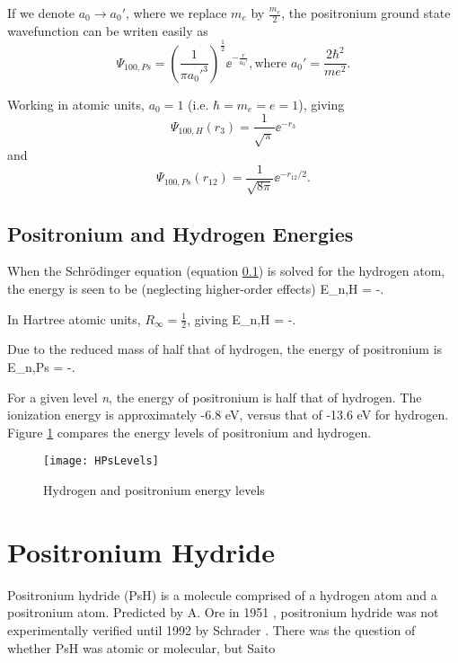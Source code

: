 \documentclass[Introduction.tex]{subfiles}
\begin{document}
If we denote $a_0 \rightarrow a_0'$, where we replace $m_e$ by $\frac{m_e}{2}$, the positronium ground state wavefunction can be writen easily as
\begin{equation}
\Psi_{100,Ps} = \left(\frac{1}{\pi {a_0'}^3}\right)^{\frac{1}{2}} \!\! \ee^{-\frac{r}{a_0'}},
\text{where } a_0' = \frac{2\hbar^2}{m e^2}.
\end{equation}

Working in atomic units, $a_0 = 1$ (i.e. $\hbar = m_e = e = 1$), giving
\begin{equation}
\Psi_{100,H}\left(r_3\right) = \frac{1}{\sqrt{\pi}} \ee^{-r_3}
\label{eq:HWave}
\end{equation}
and
\begin{equation}
\Psi_{100,Ps}\left(r_{12}\right) = \frac{1}{\sqrt{8 \pi}} \ee^{-r_{12}/2}.
\label{eq:PsWave}
\end{equation}

\subsection{Positronium and Hydrogen Energies}

When the Schr\"{o}dinger equation (equation \ref{}) is solved for the hydrogen atom, the energy is seen to be (neglecting higher-order effects)
\beq
\label{eq:HEnergy}
E_{n,H} = -.
\eeq

\noindent In Hartree atomic units, $R_\infty = \frac{1}{2}$, giving
\beq
\label{eq:HEnergyAU}
E_{n,H} = -.
\eeq

\noindent Due to the reduced mass of half that of hydrogen, the energy of positronium is
\beq
\label{eq:PsEnergyAU}
E_{n,Ps} = -.
\eeq

\noindent For a given level \emph{n}, the energy of positronium is half that of hydrogen.  The ionization energy is approximately -6.8 eV, versus that of -13.6 eV for hydrogen.  Figure \ref{fig:HPsLevels} compares the energy levels of positronium and hydrogen.

\begin{figure}[H]
	\centering
	\texttt{[image: HPsLevels]}
	\caption{Hydrogen and positronium energy levels}
	\label{fig:HPsLevels}
\end{figure}

\section{Positronium Hydride}
\label{sec:PsH}
Positronium hydride (PsH) is a molecule comprised of a hydrogen atom and a positronium atom.  Predicted by A. Ore in 1951 \cite{Ore1951}, positronium hydride was not experimentally verified until 1992 by Schrader \cite{Schrader1992}. There was the question of whether PsH was atomic or molecular, but Saito \cite{Saito2000}
\end{document}

